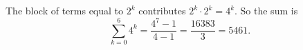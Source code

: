 The block of terms equal to $2^k$ contributes $2^k\cdot2^k=4^k$. So the sum is
\[\sum_{k=0}^{6}4^k=\dfrac{4^7-1}{4-1}=\dfrac{16383}{3}=\boxed{5461}.\]
